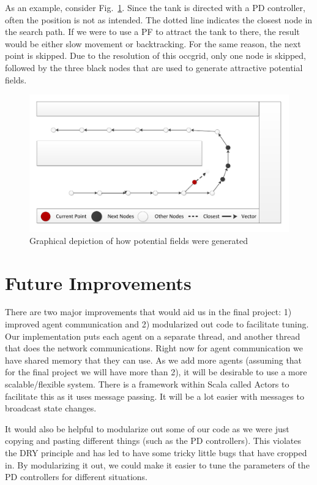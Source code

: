 \documentclass{article}
\begin{document}
As an example, consider Fig.~\ref{fig:graph_pf_generator}.  Since the tank is directed with a PD controller, often the position is not as intended.  The dotted line indicates the closest node in the search path.  If we were to use a PF to attract the tank to there, the result would be either slow movement or backtracking.  For the same reason, the next point is skipped.  Due to the resolution of this occgrid, only one node is skipped, followed by the three black nodes that are used to generate attractive potential fields.

\begin{figure}[h!tb]
	\label{fig:graph_pf_generator}
	\begin{center}
	\includegraphics[width=.4\textwidth,page=1]{graphics/drawing}
	\end{center}
	\caption{Graphical depiction of how potential fields were generated}
\end{figure}

\section{Future Improvements}

There are two major improvements that would aid us in the final project: 1) improved agent communication and 2) modularized out code to facilitate tuning.
Our implementation puts each agent on a separate thread, and another thread that does the network communications.
Right now for agent communication we have shared memory that they can use.
As we add more agents (assuming that for the final project we will have more than 2), it will be desirable to use a more scalable/flexible system.
There is a framework within Scala called Actors to facilitate this as it uses message passing.
It will be a lot easier with messages to broadcast state changes.

It would also be helpful to modularize out some of our code as we were just copying and pasting different things (such as the PD controllers).
This violates the DRY principle and has led to have some tricky little bugs that have cropped in.
By modularizing it out, we could make it easier to tune the parameters of the PD controllers for different situations.
\end{document}
